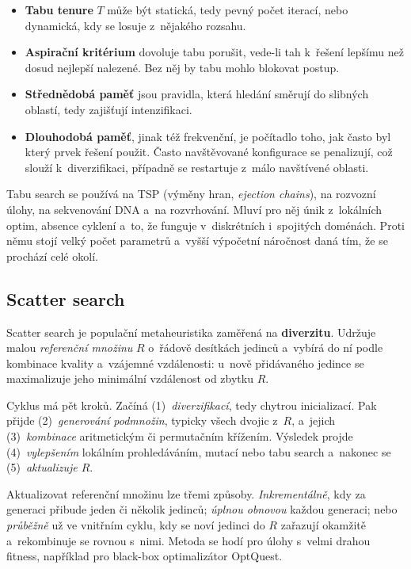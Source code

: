 \documentclass[11pt,a4paper]{article}
\theoremstyle{definition}
\begin{document}
\begin{itemize}
\item \textbf{Tabu tenure} $T$ může být statická, tedy pevný počet iterací, nebo
  dynamická, kdy se losuje z~nějakého rozsahu.
\item \textbf{Aspirační kritérium} dovoluje tabu porušit, vede-li tah k~řešení lepšímu
  než dosud nejlepší nalezené. Bez něj by tabu mohlo blokovat postup.
\item \textbf{Střednědobá paměť} jsou pravidla, která hledání směrují do slibných
  oblastí, tedy zajišťují intenzifikaci.
\item \textbf{Dlouhodobá paměť}, jinak též frekvenční, je počítadlo toho, jak často byl
  který prvek řešení použit. Často navštěvované konfigurace se penalizují, což slouží
  k~diverzifikaci, případně se restartuje z~málo navštívené oblasti.
\end{itemize}

Tabu search se používá na TSP (výměny hran, \emph{ejection chains}), na rozvozní úlohy,
na sekvenování DNA a~na rozvrhování. Mluví pro něj únik z~lokálních optim, absence
cyklení a~to, že funguje v~diskrétních i~spojitých doménách. Proti němu stojí velký počet
parametrů a~vyšší výpočetní náročnost daná tím, že se prochází celé okolí.

\subsection{Scatter search}

Scatter search je populační metaheuristika zaměřená na \textbf{diverzitu}. Udržuje malou
\emph{referenční množinu} $R$ o~řádově desítkách jedinců a~vybírá do ní podle kombinace
kvality a~vzájemné vzdálenosti: u~nově přidávaného jedince se maximalizuje jeho minimální
vzdálenost od zbytku $R$.

Cyklus má pět kroků. Začíná (1)~\emph{diverzifikací}, tedy chytrou inicializací. Pak
přijde (2)~\emph{generování podmnožin}, typicky všech dvojic z~$R$, a~jejich
(3)~\emph{kombinace} aritmetickým či permutačním křížením. Výsledek projde
(4)~\emph{vylepšením} lokálním prohledáváním, mutací nebo tabu search a~nakonec se
(5)~\emph{aktualizuje $R$}.

Aktualizovat referenční množinu lze třemi způsoby. \emph{Inkrementálně}, kdy za generaci
přibude jeden či několik jedinců; \emph{úplnou obnovou} každou generaci; nebo \emph{průběžně}
už ve vnitřním cyklu, kdy se noví jedinci do $R$ zařazují okamžitě a~rekombinuje se
rovnou s~nimi. Metoda se hodí pro úlohy s~velmi drahou fitness, například pro black-box
optimalizátor OptQuest.
\end{document}
